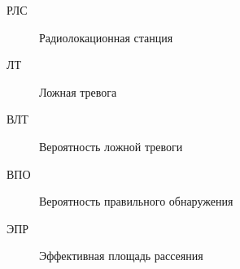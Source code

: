 \Abbreviations %
\begin{description}
\item[РЛС] Радиолокационная станция
\item [ЛТ] Ложная тревога
\item [ВЛТ] Вероятность ложной тревоги
\item [ВПО] Вероятность правильного обнаружения
\item [ЭПР] Эффективная площадь рассеяния
\end{description}

